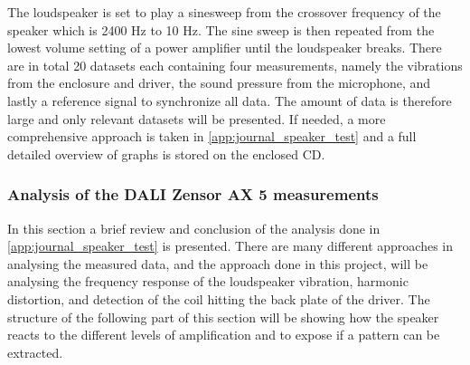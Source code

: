 The loudspeaker is set to play a sinesweep from the crossover frequency of the speaker which is 2400 Hz to 10 Hz. The sine sweep is then repeated from the lowest volume setting of a power amplifier until the loudspeaker breaks. There are in total 20 datasets each containing four measurements, namely the vibrations from the enclosure and driver, the sound pressure from the microphone, and lastly a reference signal to synchronize all data. The amount of data is therefore large and only relevant datasets will be presented. If needed, a more comprehensive approach is taken in \autoref{app:journal_speaker_test} and a full detailed overview of graphs is stored on the enclosed CD.%


\subsubsection{Analysis of the DALI Zensor AX 5 measurements}

In this section a brief review and conclusion of the analysis done in \autoref{app:journal_speaker_test} is presented. 
There are many different approaches in analysing the measured data, and the approach done in this project, will be analysing the frequency response of the loudspeaker vibration, harmonic distortion, and detection of the coil hitting the back plate of the driver. The structure of the following part of this section will be showing how the speaker reacts to the different levels of amplification and to expose if a pattern can be extracted.




